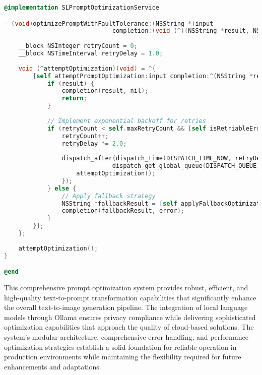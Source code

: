 \begin{lstlisting}[language=C,basicstyle=\footnotesize\ttfamily,frame=single,breaklines=true,columns=flexible,caption={Fault Tolerance Implementation},label={lst:fault_tolerance}]
@implementation SLPromptOptimizationService

- (void)optimizePromptWithFaultTolerance:(NSString *)input 
                              completion:(void (^)(NSString *result, NSError *error))completion {
    
    __block NSInteger retryCount = 0;
    __block NSTimeInterval retryDelay = 1.0;
    
    void (^attemptOptimization)(void) = ^{
        [self attemptPromptOptimization:input completion:^(NSString *result, NSError *error) {
            if (result) {
                completion(result, nil);
                return;
            }
            
            // Implement exponential backoff for retries
            if (retryCount < self.maxRetryCount && [self isRetriableError:error]) {
                retryCount++;
                retryDelay *= 2.0;
                
                dispatch_after(dispatch_time(DISPATCH_TIME_NOW, retryDelay * NSEC_PER_SEC), 
                              dispatch_get_global_queue(DISPATCH_QUEUE_PRIORITY_DEFAULT, 0), ^{
                    attemptOptimization();
                });
            } else {
                // Apply fallback strategy
                NSString *fallbackResult = [self applyFallbackOptimization:input];
                completion(fallbackResult, error);
            }
        }];
    };
    
    attemptOptimization();
}

@end
\end{lstlisting}

This comprehensive prompt optimization system provides robust, efficient, and high-quality text-to-prompt transformation capabilities that significantly enhance the overall text-to-image generation pipeline. The integration of local language models through Ollama ensures privacy compliance while delivering sophisticated optimization capabilities that approach the quality of cloud-based solutions. The system's modular architecture, comprehensive error handling, and performance optimization strategies establish a solid foundation for reliable operation in production environments while maintaining the flexibility required for future enhancements and adaptations.

